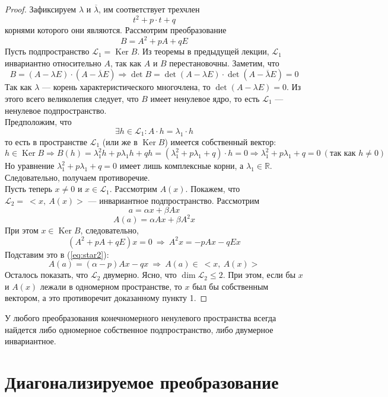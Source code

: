 \documentclass[11pt]{article}
\DeclareMathOperator{\Ker}{Ker}
\begin{document}
\begin{proof}
    Зафиксируем $\lambda$ и $\overline{\lambda}$, им соответствует трехчлен \[t^2 + p \cdot t + q\]
    корнями которого они являются. Рассмотрим преобразование \[B = A^2 + p A + q E\]
    Пусть подпространство $\mathcal{L}_1 = \Ker B$. Из теоремы в предыдущей лекции,
    $\mathcal{L}_1$ инвариантно относительно $A$, так как $A$ и $B$ перестановочны.
    Заметим, что \[ B = (A - \lambda E) \cdot (A - \overline{\lambda} E) \Longrightarrow
    \det B = \det (A - \lambda E) \cdot \det (A - \overline{\lambda} E) = 0\]
    Так как $\lambda$ --- корень характеристического многочлена, то
    $\det (A - \lambda E) = 0$. Из этого всего великолепия следует, что $B$ имеет 
    ненулевое ядро, то есть $\mathcal{L}_1$ --- ненулевое подпространство. \\
    Предположим, что \[\exists h \in \mathcal{L}_1: A \cdot h = \lambda_1 \cdot h\]
    то есть в пространстве $\mathcal{L}_1$ (или же в $\Ker B$) имеется собственный вектор:
    \[h \in \Ker B \Longrightarrow B(h) = \lambda_1^2 h + p \lambda_1 h + q h = (\lambda_1^2 + p \lambda_1 + q) \cdot h = 0 
    \Longrightarrow \lambda_1^2 + p \lambda_1 + q = 0 \ (\text{так как } h \ne 0)\]  
    Но уравнение $\lambda_1^2 + p \lambda_1 + q = 0$ имеет лишь комплексные корни, а $\lambda_1 \in \mathbb{R}$.
    Следовательно, получаем противоречие. \\
    Пусть теперь $x \ne 0$ и $x \in \mathcal{L}_1$. Рассмотрим $A(x)$. Покажем, что 
    $\mathcal{L}_2 = \ <x, \ A(x)>$ --- инвариантное подпространство. Рассмотрим 
    \[a = \alpha x + \beta A x\] \[A(a) = \alpha A x + \beta A^2 x \label{eq:star2} \tag{*}\]
    При этом $x \in \Ker B$, следовательно, \[(A^2 + p A + q E) x = 0 \ \Longrightarrow
    \ A^2 x = -p A x - q E x\]
    Подставим это в (\ref{eq:star2}): \[A(a) = (\alpha - p) A x - q x \ \Longrightarrow
    \ A(a) \in \ <x, \ A(x)>\]
    Осталось показать, что $\mathcal{L}_2$ двумерно. Ясно, что $\dim \mathcal{L}_2 \leq 2$.
    При этом, если бы $x$ и $A(x)$ лежали в одномерном пространстве, то $x$ был бы собственным 
    вектором, а это противоречит доказанному пункту 1.
\end{proof}

\begin{consequence}
    У любого преобразования конечномерного ненулевого пространства всегда найдется 
    либо одномерное собственное подпространство, либо двумерное инвариантное.
\end{consequence}

\section{Диагонализируемое преобразование}
\end{document}

